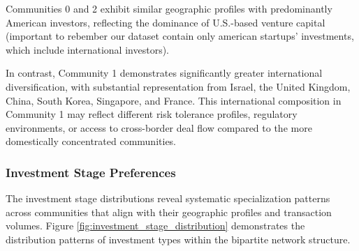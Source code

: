 
Communities 0 and 2 exhibit similar geographic profiles with predominantly American investors, reflecting the dominance of U.S.-based venture capital (important to rebember our dataset contain only american startups' investments, which include international investors). 

In contrast, Community 1 demonstrates significantly greater international diversification, with substantial representation from Israel, the United Kingdom, China, South Korea, Singapore, and France. This international composition in Community 1 may reflect different risk tolerance profiles, regulatory environments, or access to cross-border deal flow compared to the more domestically concentrated communities.

\subsubsection{Investment Stage Preferences}

The investment stage distributions reveal systematic specialization patterns across communities that align with their geographic profiles and transaction volumes. Figure \ref{fig:investment_stage_distribution} demonstrates the distribution patterns of investment types within the bipartite network structure.

